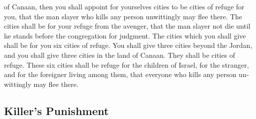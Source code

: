 \begin{paracol}{2}
\begin{otherlanguage}{english}
of Canaan,  then you shall appoint for yourselves cities
to be cities of refuge for you, that the man slayer who kills any person
unwittingly may flee there.  The cities shall be for your
refuge from the avenger, that the man slayer not die until he stands
before the congregation for judgment.  The cities which
you shall give shall be for you six cities of refuge. 
You shall give three cities beyond the Jordan, and you shall give three
cities in the land of Canaan. They shall be cities of refuge.
 These six cities shall be refuge for the children of
Israel, for the stranger, and for the foreigner living among them, that
everyone who kills any person unwittingly may flee there.

\hypertarget{killers-punishment}{%
\subsection{Killer's Punishment}\label{killers-punishment}}


\end{otherlanguage}
\end{paracol}
